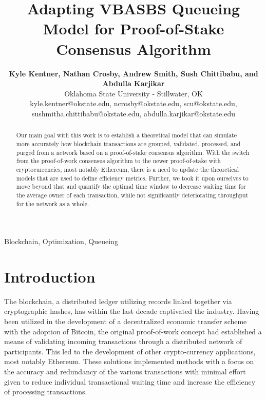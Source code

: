 \documentclass[conference]{IEEEtran}
\begin{document}
\title{Adapting VBASBS Queueing Model for Proof-of-Stake Consensus Algorithm}

\author{
  \textbf{Kyle Kentner, Nathan Crosby, Andrew Smith, Sush Chittibabu, and Abdulla Karjikar}\\
  Oklahoma State University - Stillwater, OK \\
  kyle.kentner@okstate.edu, ncrosby@okstate.edu, scu@okstate.edu, \\
  sushmitha.chittibabu@okstate.edu, abdulla.karjikar@okstate.edu}

\maketitle

\begin{abstract}

Our main goal with this work is to establish a theoretical model that can simulate
more accurately how blockchain transactions are grouped, validated, processed,
and purged from a network based on a proof-of-stake consensus algorithm. With 
the switch from the proof-of-work consensus algorithm to the newer proof-of-stake with 
cryptocurrencies, most notably Ethereum, there is a need to update the theoretical 
models that are used to define efficiency metrics. Further, we took it upon ourselves 
to move beyond that and quantify the optimal time window to decrease waiting time
for the average owner of each transaction, while not significantly deteriorating throughput
for the network as a whole.

\end{abstract}

\begin{IEEEkeywords}
Blockchain, Optimization, Queueing
\end{IEEEkeywords}

\section{Introduction}\label{Intro}

The blockchain, a distributed ledger utilizing records linked together via cryptographic 
hashes, has within the last decade captivated the industry. Having been utilized in the 
development of a decentralized economic transfer scheme with the adoption of 
Bitcoin\cite{2008_Bitcoin_Nakamoto}, the original proof-of-work concept had established 
a means of validating incoming transactions through a distributed network of participants. 
This led to the development of other crypto-currency applications, most notably Ethereum. 
These solutions implemented methods with a focus on the accuracy and redundancy of the 
various transactions with minimal effort given to reduce individual transactional waiting 
time and increase the efficiency of processing transactions.
\end{document}
